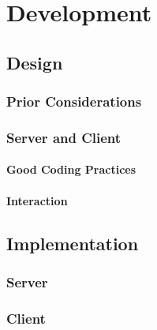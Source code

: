 \documentclass[bsc,frontabs,twoside,singlespacing,parskip,deptreport]{infthesis}     %
\begin{document}
\chapter{Development}
\section{Design}
\subsection{Prior Considerations}
\subsection{Server and Client}
\subsubsection{Good Coding Practices}
\subsubsection{Interaction}

\section{Implementation}
\subsection{Server}
\subsection{Client}
\end{document}
